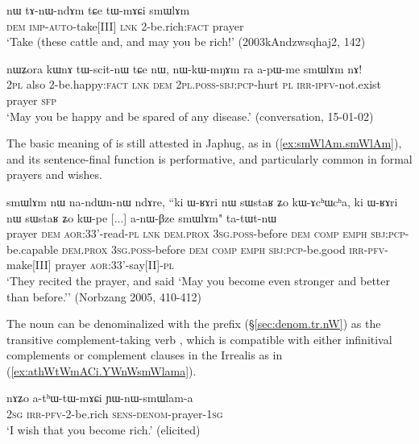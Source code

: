 \begin{exe}
	\ex \label{ex:tWmACi.smWlAm}
	\gll  nɯ tɤ-nɯ-ndɤm tɕe tɯ-mɤɕi smɯlɤm  \\
	\textsc{dem} \textsc{imp}-\textsc{auto}-take[III] \textsc{lnk} 2-be.rich:\textsc{fact} prayer \\
	\glt `Take (these cattle and, and may you be rich!' (2003kAndzwsqhaj2, 142)
\end{exe}

\begin{exe}
	\ex \label{ex:tWscitnW.nWkWmNAm.smWlAm}
	\gll    nɯʑora kɯnɤ tɯ-scit-nɯ tɕe nɯ, nɯ-kɯ-mŋɤm ra a-pɯ-me smɯlɤm nɤ! \\
	\textsc{2pl} also 2-be.happy:\textsc{fact} \textsc{lnk} \textsc{dem} \textsc{2pl}.\textsc{poss}-\textsc{sbj}:\textsc{pcp}-hurt \textsc{pl} \textsc{irr}-\textsc{ipfv}-not.exist prayer \textsc{sfp} \\
	\glt `May you be happy and be spared of any disease.' (conversation, 15-01-02)
\end{exe}

The basic meaning of   is still attested in Japhug, as in (\ref{ex:smWlAm.smWlAm}), and its sentence-final function is performative, and particularly common in formal prayers and wishes.

\begin{exe}
	\ex \label{ex:smWlAm.smWlAm}
	\gll    smɯlɤm nɯ na-ndɯn-nɯ ndɤre, ``ki ɯ-ʁɤri nɯ sɯstaʁ ʑo kɯ-ɤcʰɯcʰa, ki ɯ-ʁɤri nɯ sɯstaʁ ʑo kɯ-pe [...] a-nɯ-βze smɯlɤm" ta-tɯt-nɯ \\
	prayer \textsc{dem} \textsc{aor}:3\fl{}3'-read-\textsc{pl}  \textsc{lnk} \textsc{dem}.\textsc{prox} \textsc{3sg}.\textsc{poss}-before \textsc{dem} \textsc{comp} \textsc{emph} \textsc{sbj}:\textsc{pcp}-be.capable \textsc{dem}.\textsc{prox} \textsc{3sg}.\textsc{poss}-before  \textsc{dem} \textsc{comp}  \textsc{emph} \textsc{sbj}:\textsc{pcp}-be.good  {   } \textsc{irr}-\textsc{pfv}-make[III] prayer  \textsc{aor}:3\fl{}3'-say[II]-\textsc{pl} \\
	\glt `They recited the prayer, and said `May you become even stronger and better than before.'' (Norbzang 2005, 410-412)
\end{exe}  

The noun  can be denominalized with the prefix  (§\ref {sec:denom.tr.nW}) as the transitive complement-taking verb , which is compatible with either infinitival complements or complement clauses in the Irrealis as in (\ref{ex:athWtWmACi.YWnWsmWlama}).

\begin{exe}
	\ex \label{ex:athWtWmACi.YWnWsmWlama}
	\gll  nɤʑo a-tʰɯ-tɯ-mɤɕi  ɲɯ-nɯ-smɯlam-a \\
	\textsc{2sg} \textsc{irr}-\textsc{pfv}-2-be.rich \textsc{sens}-\textsc{denom}-prayer-\textsc{1sg} \\
	\glt `I wish that you become rich.' (elicited)
\end{exe}  
